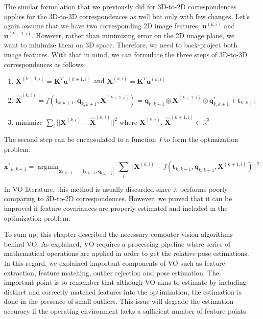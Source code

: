 \documentclass[a4paper]{report}
\numberwithin{figure}{section}
\newcommand{\argmin}{\mathop{\mathrm{argmin}}}
\newcommand{\R}{\mathbb{R}}
\begin{document}
The similar formulation that we previously did for 3D-to-2D correspondences 
applies for the 3D-to-3D correspondences as well but only with few changes. 
Let's again assume that we have two corresponding 2D image features, 
$\mathbf{u}^{(k,i)}$ and $\mathbf{u}^{(k+1,i)}$. However, rather than 
minimizing error on the 2D image plane, we want to minimize them on 3D space. 
Therefore, we need to back-project both image features. With that in mind, we 
can formulate the three steps of 3D-to-3D correspondences as follows:

\begin{enumerate}
  \item $\mathbf{X}^{(k+1,i)} = \mathbf{K}^T\mathbf{u}^{(k+1,i)}$ and 
    $\mathbf{X}^{(k,i)} = \mathbf{K}^T\mathbf{u}^{(k,i)}$ 
  \item $\mathbf{\hat{X}}^{(k,i)} = f(\mathbf{t}_{k,k+1}, \mathbf{q}_{k,k+1}, 
  \mathbf{X}^{(k+1,i)}) = 
    \mathbf{q}_{k,k+1} \otimes \mathbf{X}^{(k+1,i)} \otimes 
    \mathbf{q}_{k,k+1}^* + \mathbf{t}_{k,k+1}$
  \item minimize $\sum_i||\mathbf{X}^{(k,i)} - \mathbf{\hat{X}}^{(k,i)}||^2$ 
  where $\mathbf{X}^{(k,i)}$, $\mathbf{\hat{X}}^{(k+1,i)} \in \R^3$

\end{enumerate}

The second step can be encapsulated to a function $f$ to form the optimization 
problem:

\begin{equation}
  \mathbf{x^*}_{k,k+1} = \argmin_{\mathbf{x}_{k,k+1} = [\mathbf{t}_{k,k+1}, 
  	\mathbf{q}_{k,k+1}]}
  \sum_i||\mathbf{X}^{(k,i)} - f(\mathbf{t}_{k,k+1}, \mathbf{q}_{k,k+1}, 
  \mathbf{X}^{(k+1,i)})||^2
\end{equation}\label{eq:3d_to_3d_rel_pose_est}

In VO literature, this method is usually discarded since it performs poorly 
comparing to 3D-to-2D correspondences. However, we proved that it can be 
improved if feature covariances are properly estimated and included in the 
optimization problem.

To sum up, this chapter described the necessary computer vision
algorithms behind VO. As explained, VO requires a processing pipeline 
where series of mathematical operations are applied in order to get 
the relative pose estimations. In this regard, we explained important 
components of VO such as feature extraction, feature matching, outlier rejection 
and pose estimation. The important point is to remember that 
although VO aims to estimate by including distinct and correctly matched 
features into the optimization, the estimation is done in the presence of 
small outliers. This issue will degrade the estimation accuracy 
if the operating environment lacks a sufficient number of feature points.
\end{document}

